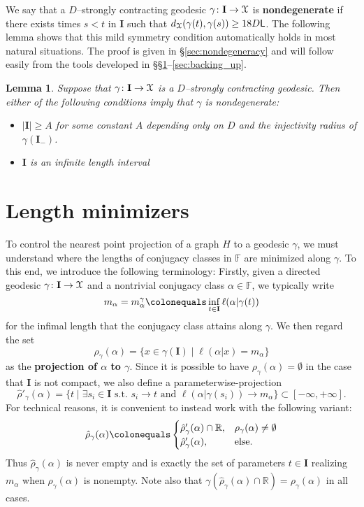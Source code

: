 \documentclass[letterpaper,fleqn]{article}
\theoremstyle{plain}
\newtheorem{lemma}[theorem]{Lemma}
\theoremstyle{definition}
\newcommand{\define}[1]{\textbf{#1}}
\newcommand{\R}{\mathbb{R}}
\newcommand{\abs}[1]{\left\vert#1\right\vert}
\newcommand{\free}{\mathbb{F}} %
\newcommand{\pl}{{\EuScript{PL}}} %
\newcommand{\os}{{\EuScript X}} %
\newcommand{\plproj}{\pi_\pl} %
\newcommand{\minlen}{m}  %
\newcommand{\minpts}{\rho} %
\newcommand{\mintime}{\hat{\minpts}} %
\newcommand{\lipconst}{{\sf L}} %
\newcommand{\I}{\mathbf{I}}
\newcommand{\Imin}{\I_-}
\begin{document}
We say that a $D$--strongly contracting geodesic $\gamma\colon \I\to \os$ is \define{nondegenerate} if there exists times $s < t$ in $\I$ such that $d_\os(\gamma(t),\gamma(s)) \ge 18D\lipconst$. The following lemma shows that this mild symmetry condition automatically holds in most natural situations. The proof is given in \S\ref{sec:nondegeneracy} and will follow easily from the tools developed in \S\S\ref{sec:length_min}--\ref{sec:backing_up}.

\begin{lemma}
\label{lem:usually_nondegenerate}
Suppose that $\gamma\colon\I\to \os$ is a $D$--strongly contracting geodesic. Then either of the following conditions imply that $\gamma$ is nondegenerate:
\begin{itemize}
\item $\abs{\I} \ge A$ for some constant $A$ depending only on $D$ and the injectivity radius of $\gamma(\Imin)$.
\item $\I$ is an infinite length interval
\end{itemize}
\end{lemma}


\section{Length minimizers}
\label{sec:length_min}
To control the nearest point projection of a graph $H$ to a geodesic $\gamma$, we must understand where the lengths of conjugacy classes in $\free$ are minimized along $\gamma$. To this end, we introduce the following terminology:  Firstly, given a directed geodesic $\gamma\colon \I\to \os$ and a nontrivial conjugacy class $\alpha\in \free$, we typically write
\[ \minlen_\alpha = \minlen_{\alpha}^{\gamma} \colonequals \inf_{t\in \I} \ell(\alpha\vert \gamma(t))\]
for the infimal length that the conjugacy class attains along $\gamma$. We then regard the set 
\[\minpts_\gamma(\alpha) = \{x\in \gamma(\I) \mid \ell(\alpha\vert x) = \minlen_\alpha\}\]
as the \define{projection of $\alpha$ to $\gamma$}. Since it is possible to have $\minpts_\gamma(\alpha)=\emptyset$ in the case that $\I$ is not compact, we also define a parameterwise-projection 
\[\mintime'_\gamma(\alpha) = \big\{t \mid \exists s_i\in \I \text{ s.t. } s_i\to t \text{ and } \ell(\alpha\vert\gamma(s_i)) \to \minlen_\alpha\} \subset [-\infty,+\infty].\]
For technical reasons, it is convenient to instead work with the following variant:
\[\mintime_\gamma(\alpha) \colonequals \begin{cases}
\mintime'_\gamma(\alpha)\cap \R, & \minpts_\gamma(\alpha)\neq \emptyset\\
\mintime'_\gamma(\alpha),& \text{else}.
\end{cases}\]
Thus $\mintime_\gamma(\alpha)$ is never empty and is exactly the set of parameters $t\in \I$ realizing $\minlen_\alpha$ when $\minpts_\gamma(\alpha)$ is nonempty. 
Note also that $\gamma(\mintime_\gamma(\alpha)\cap \R) = \minpts_\gamma(\alpha)$ in all cases.
\end{document}
